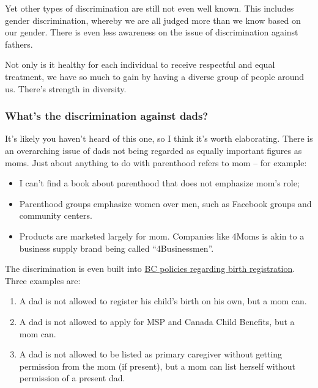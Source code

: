 \documentclass[]{article}
\providecommand{\tightlist}{%
  \setlength{\itemsep}{0pt}\setlength{\parskip}{0pt}}
\begin{document}
Yet other types of discrimination are still not even well known. This includes gender discrimination, whereby we are all judged more than we know based on our gender. There is even less awareness on the issue of discrimination against fathers.

Not only is it healthy for each individual to receive respectful and equal treatment, we have so much to gain by having a diverse group of people around us. There's strength in diversity.

\hypertarget{whats-the-discrimination-against-dads}{%
\subsubsection{What's the discrimination against dads?}\label{whats-the-discrimination-against-dads}}

It's likely you haven't heard of this one, so I think it's worth elaborating. There is an overarching issue of dads not being regarded as equally important figures as moms. Just about anything to do with parenthood refers to mom -- for example:

\begin{itemize}
\tightlist
\item
  I can't find a book about parenthood that does not emphasize mom's role;
\item
  Parenthood groups emphasize women over men, such as Facebook groups and community centers.
\item
  Products are marketed largely for mom. Companies like 4Moms is akin to a business supply brand being called ``4Businessmen''.
\end{itemize}

The discrimination is even built into \href{https://www2.gov.bc.ca/gov/content/life-events/birth-adoption/births/birth-registration}{BC policies regarding birth registration}. Three examples are:

\begin{enumerate}
\def\labelenumi{\arabic{enumi}.}
\tightlist
\item
  A dad is not allowed to register his child's birth on his own, but a mom can.
\item
  A dad is not allowed to apply for MSP and Canada Child Benefits, but a mom can.
\item
  A dad is not allowed to be listed as primary caregiver without getting permission from the mom (if present), but a mom can list herself without permission of a present dad.
\end{enumerate}
\end{document}
